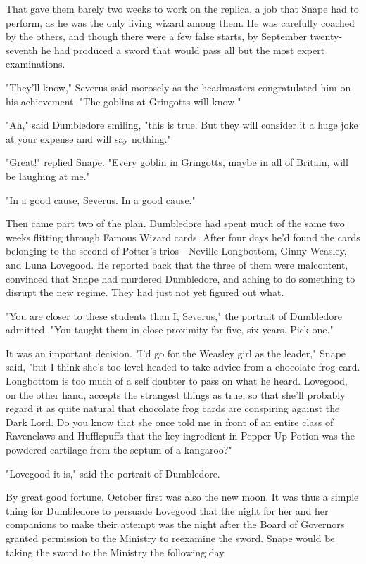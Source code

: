 \documentclass[a4paper,11pt]{article}
\begin{document}
That gave them barely two weeks to work on the replica, a job that Snape had to perform, as he was the only living wizard among them. He was carefully coached by the others, and though there were a few false starts, by September twenty-seventh he had produced a sword that would pass all but the most expert examinations.

"They'll know," Severus said morosely as the headmasters congratulated him on his achievement. "The goblins at Gringotts will know."

"Ah," said Dumbledore smiling, "this is true. But they will consider it a huge joke at your expense and will say nothing."

"Great!" replied Snape. "Every goblin in Gringotts, maybe in all of Britain, will be laughing at me."

"In a good cause, Severus. In a good cause."

Then came part two of the plan. Dumbledore had spent much of the same two weeks flitting through Famous Wizard cards. After four days he'd found the cards belonging to the second of Potter's trios - Neville Longbottom, Ginny Weasley, and Luna Lovegood. He reported back that the three of them were malcontent, convinced that Snape had murdered Dumbledore, and aching to do something to disrupt the new regime. They had just not yet figured out what.

"You are closer to these students than I, Severus," the portrait of Dumbledore admitted. "You taught them in close proximity for five, six years. Pick one."

It was an important decision. "I'd go for the Weasley girl as the leader," Snape said, "but I think she's too level headed to take advice from a chocolate frog card. Longbottom is too much of a self doubter to pass on what he heard. Lovegood, on the other hand, accepts the strangest things as true, so that she'll probably regard it as quite natural that chocolate frog cards are conspiring against the Dark Lord. Do you know that she once told me in front of an entire class of Ravenclaws and Hufflepuffs that the key ingredient in Pepper Up Potion was the powdered cartilage from the septum of a kangaroo?"

"Lovegood it is," said the portrait of Dumbledore.

By great good fortune, October first was also the new moon. It was thus a simple thing for Dumbledore to persuade Lovegood that the night for her and her companions to make their attempt was the night after the Board of Governors granted permission to the Ministry to reexamine the sword. Snape would be taking the sword to the Ministry the following day.
\end{document}
